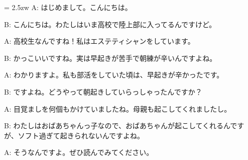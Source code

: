 \documentclass[11pt]{amsart}
\title{}
\author{}
\newenvironment{hangall}[1]{\hangindent = 2.5zw\everypar{\hangindent = 2.5zw}}{}
\begin{document}
\maketitle
\begin{hangall}{}%
A: はじめまして。こんにちは。



B: こんにちは。わたしはいま高校で陸上部に入ってるんですけど。



A: 高校生なんですね！私はエステティシャンをしています。



B: かっこいいですね。実は早起きが苦手で朝練が辛いんですよね。



A: わかりますよ。私も部活をしていた頃は、早起きが辛かったです。



B: ですよね。どうやって朝起きしていらっしゃったんですか？



A: 目覚ましを何個もかけていましたね。母親も起こしてくれましたし。



B: わたしはおばあちゃんっ子なので、おばあちゃんが起こしてくれるんですが、ソフト過ぎて起きられないんですよね。



A: そうなんですよ。ぜひ読んでみてください。\end{hangall}
\end{document}
